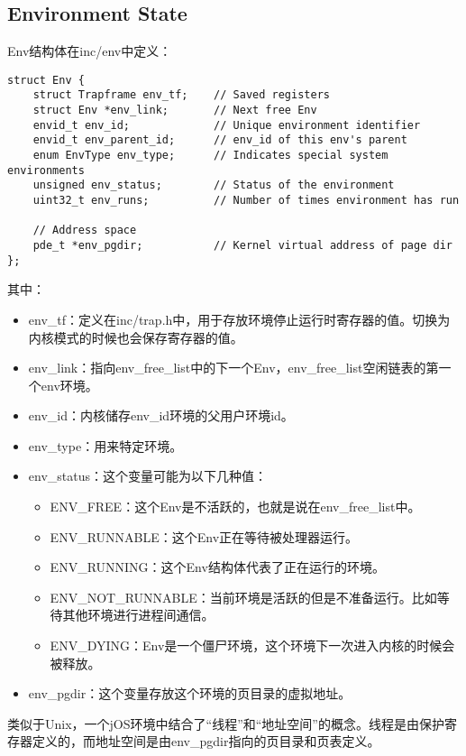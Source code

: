 \subsection{Environment State}
\par Env结构体在inc/env中定义：
\begin{lstlisting}
struct Env {
    struct Trapframe env_tf;	// Saved registers
    struct Env *env_link;		// Next free Env
    envid_t env_id;			    // Unique environment identifier
    envid_t env_parent_id;		// env_id of this env's parent
    enum EnvType env_type;		// Indicates special system environments
    unsigned env_status;		// Status of the environment
    uint32_t env_runs;		    // Number of times environment has run

    // Address space
    pde_t *env_pgdir;		    // Kernel virtual address of page dir
};
\end{lstlisting}
\par 其中：
\begin{itemize}
    \item env\_tf：定义在inc/trap.h中，用于存放环境停止运行时寄存器的值。切换为内核模式的时候也会保存寄存器的值。
    \item env\_link：指向env\_free\_list中的下一个Env，env\_free\_list空闲链表的第一个env环境。
    \item env\_id：内核储存env\_id环境的父用户环境id。
    \item env\_type：用来特定环境。
    \item env\_status：这个变量可能为以下几种值：
        \begin{itemize}
            \item ENV\_FREE：这个Env是不活跃的，也就是说在env\_free\_list中。
            \item ENV\_RUNNABLE：这个Env正在等待被处理器运行。
            \item ENV\_RUNNING：这个Env结构体代表了正在运行的环境。
            \item ENV\_NOT\_RUNNABLE：当前环境是活跃的但是不准备运行。比如等待其他环境进行进程间通信。
            \item ENV\_DYING：Env是一个僵尸环境，这个环境下一次进入内核的时候会被释放。
        \end{itemize}
    \item env\_pgdir：这个变量存放这个环境的页目录的虚拟地址。
\end{itemize}
\par 类似于Unix，一个jOS环境中结合了``线程''和``地址空间''的概念。线程是由保护寄存器定义的，而地址空间是由env\_pgdir指向的页目录和页表定义。

